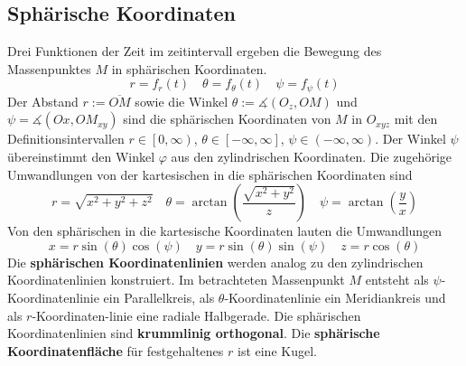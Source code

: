 \subsection{Sphärische Koordinaten}
Drei Funktionen der Zeit im zeitintervall ergeben die Bewegung des Massenpunktes $M$ in sphärischen Koordinaten.
\begin{equation}
\boxed{r=f_r\left(t\right)}\quad \boxed{\theta=f_{\theta}\left(t\right)}\quad \boxed{\psi=f_{\psi}\left(t\right)}
\end{equation}
Der Abstand $r:=\overline{OM}$ sowie die Winkel $\theta:=\measuredangle\left(O_z, OM\right)$ und $\psi=\measuredangle\left(Ox, OM_{xy}\right)$ sind die sphärischen Koordinaten von $M$ in $O_{xyz}$ mit den Definitionsintervallen $r\in\left[0,\infty\right)$, $\theta\in\left[-\infty, \infty\right]$, $\psi\in\left(-\infty, \infty\right)$. Der Winkel $\psi$ übereinstimmt den Winkel $\varphi$ aus den zylindrischen Koordinaten.
\newline\newline
Die zugehörige Umwandlungen von der kartesischen in die sphärischen Koordinaten sind
\begin{equation} 
\boxed{r=\sqrt{x^2+y^2+z^2}}\quad \boxed{\theta=\arctan\left(\dfrac{\sqrt{x^2+y^2}}{z}\right)}\quad \boxed{\psi=\arctan\left(\dfrac{y}{x}\right)}
\end{equation} 
Von den sphärischen in die kartesische Koordinaten lauten die Umwandlungen
\begin{equation}
\boxed{x=r\sin\left(\theta\right)\cos\left(\psi\right)}\quad \boxed{y=r\sin\left(\theta\right)\sin\left(\psi\right)}\quad \boxed{z=r\cos\left(\theta\right)}
\end{equation}
Die \textbf{sphärischen Koordinatenlinien} werden analog zu den zylindrischen Koordinatenlinien konstruiert. Im betrachteten Massenpunkt $M$ entsteht als $\psi$-Koordinatenlinie ein Parallelkreis, als $\theta$-Koordinatenlinie ein Meridiankreis und als $r$-Koordinaten-linie eine radiale Halbgerade. Die sphärischen Koordinatenlinien sind \textbf{krummlinig orthogonal}. Die \textbf{sphärische Koordinatenfläche} für festgehaltenes $r$ ist eine Kugel.